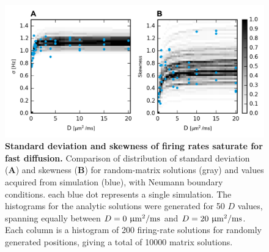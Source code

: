 \documentclass[10pt,letterpaper]{article}
\begin{document}
\begin{figure}
\includegraphics[width=\textwidth]{./figures/std_and_skew_sim_and_analytic.png}
\caption{{\bf Standard deviation and skewness of firing rates saturate for fast diffusion.} Comparison of distribution of standard deviation (\textbf{A}) and skewness (\textbf{B}) for random-matrix solutions (gray) and values acquired from simulation (blue), with Neumann boundary conditions. each blue dot represents a single simulation. The histograms for the analytic solutions were generated for 50 $D$ values, spanning equally between $D = \rm 0~\upmu m^2 / ms$ and $D = \rm 20~ \upmu m^2 /ms$. Each column is a histogram of 200 firing-rate solutions for randomly generated positions, giving a total of 10000 matrix solutions.}
\label{std_and_skew_sim_and_analytic}
\end{figure}
\end{document}
